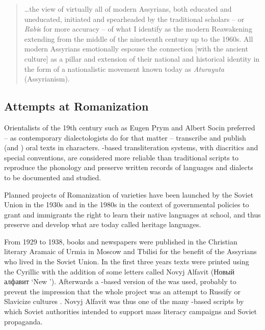 \documentclass[output=paper,colorlinks,citecolor=brown,arabfont,syriacfont]{langscibook}
\begin{document}
\begin{quote}
…the view of virtually all of modern Assyrians, both educated and uneducated, initiated and spearheaded by the traditional scholars -- or \textit{Rabi}s for more accuracy -- of what I identify as the modern  Reawakening extending from the middle of the nineteenth century up to the 1960s. All modern Assyrians emotionally espouse the connection [with the ancient  culture] as a pillar and extension of their national and historical identity in the form of a nationalistic movement known today as \textit{Aturayuta} (Assyrianism). \citep[139]{odisho2001}
\end{quote}

    \subsection{Attempts at Romanization}\label{ch.3.6.ss.3.3}

 Orientalists of the 19th century such as Eugen Prym and Albert Socin preferred -- as contemporary dialectologists do for that matter -- transcribe and publish  (and ) oral texts in  characters. -based transliteration systems, with diacritics and special conventions, are considered more reliable than traditional scripts to reproduce the phonology and preserve written records of languages and dialects to be documented and studied. 


Planned projects of Romanization of  varieties have been launched by the Soviet Union in the 1930s and  in the 1980s in the context of governmental policies to grant  and immigrants the right to learn their native languages at school, and thus preserve and develop what are today called heritage languages. 


From 1929 to 1938, books and newspapers were published in the Christian literary Aramaic of Urmia in Moscow and Tbilisi for the benefit of the Assyrians who lived in the Soviet Union. In the first three years texts were printed using the Cyrillic  with the addition of some  letters called Novyj Alfavit (Новый алфавит `New '). Afterwards a -based version of the  was used, probably to prevent the impression that the whole project was an attempt to Russify or Slavicize  cultures \citep[16]{pennacchietti_tosco1991}.  Novyj Alfavit was thus one of the many -based scripts by which Soviet authorities intended to support mass literacy campaigns and Soviet propaganda. 
\end{document}
